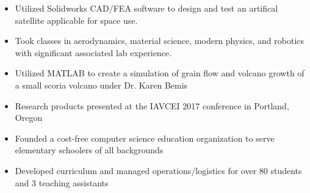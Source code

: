 \documentclass[10pt,a4paper,ragged2e]{altacv}
\begin{document}

\begin{itemize}
\item Utilized Solidworks CAD/FEA software to design and test an artifical satellite applicable for space use.
\item Took classes in aerodynamics, material science, modern physics, and robotics with significant associated lab experience.
\end{itemize}
\divider

\begin{itemize}
\item Utilized MATLAB to create a simulation of grain flow and volcano growth of a small scoria volcano under Dr. Karen Bemis
\item Research products presented at the IAVCEI 2017 conference in \newline Portland, Oregon
\end{itemize}


\begin{itemize}
  \item Founded a cost-free computer science education organization to serve elementary schoolers of all backgrounds
  \item Developed curriculum and managed operations/logistics for over 80 students and 3 teaching assistants
\end{itemize}


\medskip



\clearpage
\end{document}

